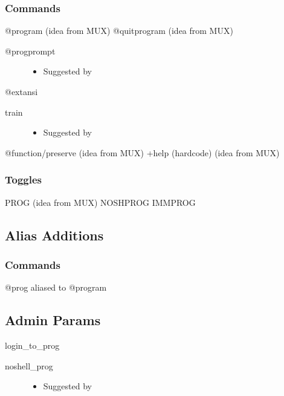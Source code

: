 \documentclass[letterpaper,10pt,english]{sphinxmanual}
\begin{document}
\subsubsection{Commands}
\label{\detokenize{changelog:id78}}
\sphinxAtStartPar
@program (idea from MUX)
@quitprogram (idea from MUX)
\begin{description}
\item[{@progprompt}] \leavevmode\begin{itemize}
\item {} 
\sphinxAtStartPar
Suggested by 

\end{itemize}

\end{description}

\sphinxAtStartPar
@extansi
\begin{description}
\item[{train}] \leavevmode\begin{itemize}
\item {} 
\sphinxAtStartPar
Suggested by 

\end{itemize}

\end{description}

\sphinxAtStartPar
@function/preserve (idea from MUX)
+help (hardcode) (idea from MUX)


\subsubsection{Toggles}
\label{\detokenize{changelog:id79}}
\sphinxAtStartPar
PROG (idea from MUX)
NOSHPROG
IMMPROG


\subsection{Alias Additions}
\label{\detokenize{changelog:alias-additions}}

\subsubsection{Commands}
\label{\detokenize{changelog:id80}}
\sphinxAtStartPar
@prog aliased to @program


\subsection{Admin Params}
\label{\detokenize{changelog:id81}}
\sphinxAtStartPar
login\_to\_prog
\begin{description}
\item[{noshell\_prog}] \leavevmode\begin{itemize}
\item {} 
\sphinxAtStartPar
Suggested by 

\end{itemize}

\end{description}
\end{document}
